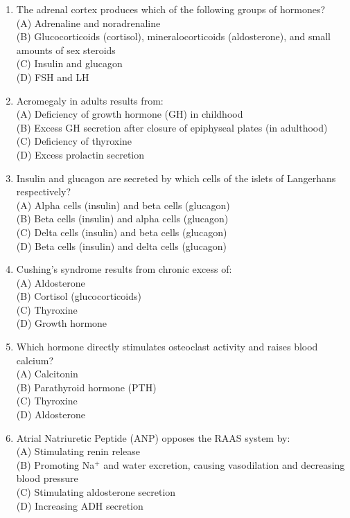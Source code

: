 \documentclass{article}
\begin{document}
\begin{enumerate}[label=Q\arabic*.]
\item The adrenal cortex produces which of the following groups of hormones?
\\(A) Adrenaline and noradrenaline
\\(B) Glucocorticoids (cortisol), mineralocorticoids (aldosterone), and small amounts of sex steroids
\\(C) Insulin and glucagon
\\(D) FSH and LH

\item Acromegaly in adults results from:
\\(A) Deficiency of growth hormone (GH) in childhood
\\(B) Excess GH secretion after closure of epiphyseal plates (in adulthood)
\\(C) Deficiency of thyroxine
\\(D) Excess prolactin secretion

\item Insulin and glucagon are secreted by which cells of the islets of Langerhans respectively?
\\(A) Alpha cells (insulin) and beta cells (glucagon)
\\(B) Beta cells (insulin) and alpha cells (glucagon)
\\(C) Delta cells (insulin) and beta cells (glucagon)
\\(D) Beta cells (insulin) and delta cells (glucagon)

\item Cushing's syndrome results from chronic excess of:
\\(A) Aldosterone
\\(B) Cortisol (glucocorticoids)
\\(C) Thyroxine
\\(D) Growth hormone

\item Which hormone directly stimulates osteoclast activity and raises blood calcium?
\\(A) Calcitonin
\\(B) Parathyroid hormone (PTH)
\\(C) Thyroxine
\\(D) Aldosterone

\item Atrial Natriuretic Peptide (ANP) opposes the RAAS system by:
\\(A) Stimulating renin release
\\(B) Promoting Na$^+$ and water excretion, causing vasodilation and decreasing blood pressure
\\(C) Stimulating aldosterone secretion
\\(D) Increasing ADH secretion


\end{enumerate}
\end{document}
